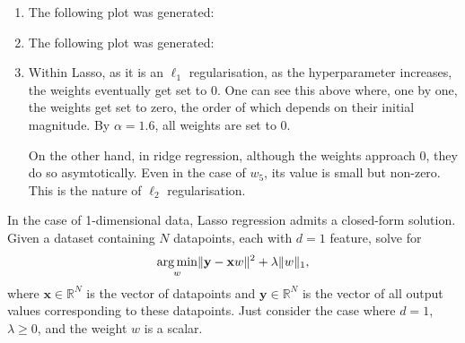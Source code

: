 \medskip
\lstset{
  basicstyle=\small\ttfamily,
  breaklines=true,
  columns=fullflexible
}

\begin{solution}
  \begin{enumerate}
    \item The following plot was generated:
    \begin{figure}[H]
    \end{figure}
    \item The following plot was generated:
    \begin{figure}[H]
    \end{figure}
    \item Within Lasso, as it is an $\ell_1$ regularisation, as the hyperparameter increases, the weights eventually get set to 0. One can see this above where, one by one, the weights get set to zero, the order of which depends on their initial magnitude. By $\alpha=1.6$, all weights are set to 0. 
    
    On the other hand, in ridge regression, although the weights approach 0, they do so asymtotically. Even in the case of $w_5$, its value is small but non-zero. This is the nature of $\ell_2$ regularisation.
  \end{enumerate}
\end{solution}

\problem[9]

\subproblem
In the case of 1-dimensional data, Lasso regression admits a closed-form solution.
Given a dataset containing $N$ datapoints, each with $d = 1$ feature, solve for
\[\underset{w}{\operatorname{arg\,min}} \Vert\mathbf{y} - \mathbf{x}w\Vert^2 + \lambda\Vert w\Vert_1,
\]
where $\mathbf{x} \in \mathbb{R}^{N}$ is the vector of datapoints and $\mathbf{y} \in \mathbb{R}^N$ is the  vector of all output values corresponding to these datapoints. Just consider the case where $d = 1$, $\lambda \geq 0$, and the weight $w$ is a scalar.

